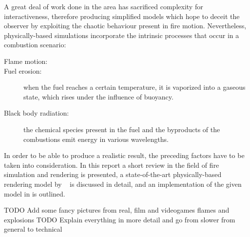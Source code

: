 A great deal of work done in the area has sacrificed complexity for interactiveness, therefore producing simplified models which hope to deceit the observer by exploiting the chaotic behaviour present in fire motion.
Nevertheless, physically-based simulations incorporate the intrinsic processes that occur in a combustion scenario:

\begin{description}
\item[Flame motion:]
\item[Fuel erosion:] when the fuel reaches a certain temperature, it is vaporized into a gaseous state, which rises under the influence of buoyancy.
\item[Black body radiation:] the chemical species present in the fuel and the byproducts of the combustions emit energy in various wavelengths.
\end{description}

In order to be able to produce a realistic result, the preceding factors have to be taken into consideration.
In this report a short review in the field of fire simulation and rendering is presented, a state-of-the-art physically-based rendering model by ~\cite{Pegoraro:2006} is discussed in detail, and an implementation of the given model in \Maya is outlined.

TODO Add some fancy pictures from real, film and videogames flames and explosions
TODO Explain everything in more detail and go from slower from general to technical